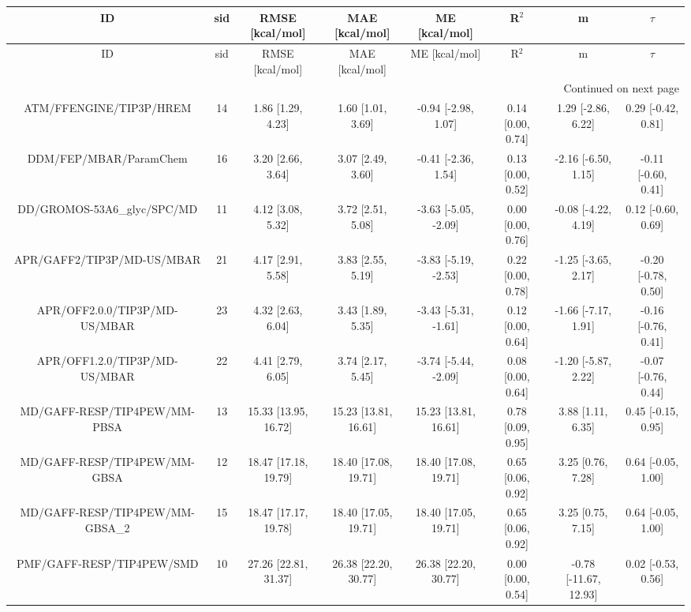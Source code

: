 \documentclass[8pt]{article}
\begin{document}
\begin{center}
\begin{footnotesize}
\begin{longtable}{|cccccccc|}
\toprule
                             ID & sid &      RMSE [kcal/mol] &       MAE [kcal/mol] &        ME [kcal/mol] &             R$^2$ &                     m &              $\tau$ \\
\midrule
\endfirsthead

\toprule
                             ID & sid &      RMSE [kcal/mol] &       MAE [kcal/mol] &        ME [kcal/mol] &             R$^2$ &                     m &              $\tau$ \\
\midrule
\endhead
\midrule
\multicolumn{8}{r}{{Continued on next page}} \\
\midrule
\endfoot

\bottomrule
\endlastfoot
        ATM/FFENGINE/TIP3P/HREM &  14 &    1.86 [1.29, 4.23] &    1.60 [1.01, 3.69] &  -0.94 [-2.98, 1.07] & 0.14 [0.00, 0.74] &    1.29 [-2.86, 6.22] &  0.29 [-0.42, 0.81] \\
         DDM/FEP/MBAR/ParamChem &  16 &    3.20 [2.66, 3.64] &    3.07 [2.49, 3.60] &  -0.41 [-2.36, 1.54] & 0.13 [0.00, 0.52] &   -2.16 [-6.50, 1.15] & -0.11 [-0.60, 0.41] \\
    DD/GROMOS-53A6\_glyc/SPC/MD &  11 &    4.12 [3.08, 5.32] &    3.72 [2.51, 5.08] & -3.63 [-5.05, -2.09] & 0.00 [0.00, 0.76] &   -0.08 [-4.22, 4.19] &  0.12 [-0.60, 0.69] \\
     APR/GAFF2/TIP3P/MD-US/MBAR &  21 &    4.17 [2.91, 5.58] &    3.83 [2.55, 5.19] & -3.83 [-5.19, -2.53] & 0.22 [0.00, 0.78] &   -1.25 [-3.65, 2.17] & -0.20 [-0.78, 0.50] \\
  APR/OFF2.0.0/TIP3P/MD-US/MBAR &  23 &    4.32 [2.63, 6.04] &    3.43 [1.89, 5.35] & -3.43 [-5.31, -1.61] & 0.12 [0.00, 0.64] &   -1.66 [-7.17, 1.91] & -0.16 [-0.76, 0.41] \\
  APR/OFF1.2.0/TIP3P/MD-US/MBAR &  22 &    4.41 [2.79, 6.05] &    3.74 [2.17, 5.45] & -3.74 [-5.44, -2.09] & 0.08 [0.00, 0.64] &   -1.20 [-5.87, 2.22] & -0.07 [-0.76, 0.44] \\
   MD/GAFF-RESP/TIP4PEW/MM-PBSA &  13 & 15.33 [13.95, 16.72] & 15.23 [13.81, 16.61] & 15.23 [13.81, 16.61] & 0.78 [0.09, 0.95] &     3.88 [1.11, 6.35] &  0.45 [-0.15, 0.95] \\
   MD/GAFF-RESP/TIP4PEW/MM-GBSA &  12 & 18.47 [17.18, 19.79] & 18.40 [17.08, 19.71] & 18.40 [17.08, 19.71] & 0.65 [0.06, 0.92] &     3.25 [0.76, 7.28] &  0.64 [-0.05, 1.00] \\
MD/GAFF-RESP/TIP4PEW/MM-GBSA\_2 &  15 & 18.47 [17.17, 19.78] & 18.40 [17.05, 19.71] & 18.40 [17.05, 19.71] & 0.65 [0.06, 0.92] &     3.25 [0.75, 7.15] &  0.64 [-0.05, 1.00] \\
      PMF/GAFF-RESP/TIP4PEW/SMD &  10 & 27.26 [22.81, 31.37] & 26.38 [22.20, 30.77] & 26.38 [22.20, 30.77] & 0.00 [0.00, 0.54] & -0.78 [-11.67, 12.93] &  0.02 [-0.53, 0.56] \\
\end{longtable}
\end{footnotesize}
\end{center}
\end{document}
